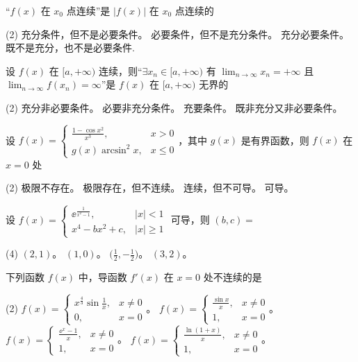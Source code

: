 \begin{ti}
	“$f(x)$ 在 $x_0$ 点连续”是 $|f(x)|$ 在 $x_0$ 点连续的
	\begin{tasks}(2)
		\task 充分条件，但不是必要条件。
		\task 必要条件，但不是充分条件。
		\task 充分必要条件。
		\task 既不是充分，也不是必要条件.
	\end{tasks}
\end{ti}

\begin{ti}
	设 $f(x)$ 在 $[a,+\infty)$ 连续，则“$\exists x_n \in [a,+\infty)$ 有 $\lim_{n \to \infty}x_n = +\infty$ 且 $\lim_{n \to \infty}f(x_n) = \infty$”是 $f(x)$ 在 $[a,+\infty)$ 无界的
	\begin{tasks}(2)
		\task 充分非必要条件。
		\task 必要非充分条件。
		\task 充要条件。
		\task 既非充分又非必要条件。
	\end{tasks}
\end{ti}

\begin{ti}
	设 $f(x) = \begin{cases}
		\frac{1-\cos x^2}{x^3}, & x > 0 \\
		g(x) \arcsin^2x, & x \leq 0
	\end{cases}$，其中 $g(x)$ 是有界函数，则 $f(x)$ 在 $x=0$ 处
	\begin{tasks}(2)
		\task 极限不存在。
		\task 极限存在，但不连续。
		\task 连续，但不可导。
		\task 可导。
	\end{tasks}
\end{ti}

\begin{ti}
	设 $f(x) = \begin{cases}
		\ee^{\frac{1}{x^2-1}}, & |x|<1 \\
		x^4 - bx^2 + c, & |x| \geq 1
	\end{cases}$ 可导，则 $(b,c) = $
	\begin{tasks}(4)
		\task $(2,1)$。
		\task $(1,0)$。
		\task $\biggl(\frac{1}{2},-\frac{1}{2}\biggr)$。
		\task $(3,2)$。
	\end{tasks}
\end{ti}

\begin{ti}
	下列函数 $f(x)$ 中，导函数 $f'(x)$ 在 $x=0$ 处不连续的是
	\begin{tasks}(2)
		\task $f(x) = \begin{cases}
			x^{\frac43} \sin \frac{1}{x}, & x \ne 0 \\
			0, & x = 0
		\end{cases}$。
		\task $f(x) = \begin{cases}
			\frac{\sin x}{x}, & x \ne 0 \\
			1, & x = 0
		\end{cases}$。
		\task $f(x) = \begin{cases}
			\frac{\ee^x-1}{x}, & x \ne 0 \\
			1, & x = 0
		\end{cases}$。
		\task $f(x) = \begin{cases}
			\frac{\ln(1+x)}{x}, & x \ne 0 \\
			1, & x = 0
		\end{cases}$。
	\end{tasks}
\end{ti}

